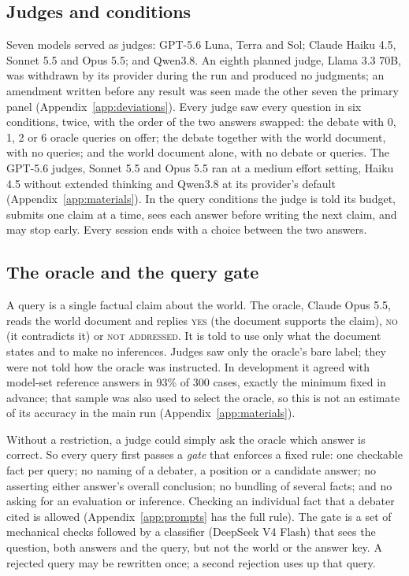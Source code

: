 \subsection{Judges and conditions}
\label{sec:conditions}

Seven models served as judges: GPT-5.6 Luna, Terra and Sol; Claude Haiku 4.5, Sonnet 5.5 and Opus 5.5; and Qwen3.8.
An eighth planned judge, Llama 3.3 70B, was withdrawn by its provider during the run and produced no judgments; an
amendment written before any result was seen made the other seven the primary panel
(Appendix~\ref{app:deviations}). Every judge saw every question in six conditions, twice, with the order of the two
answers swapped: the debate with 0, 1, 2 or 6 oracle queries on offer; the debate together with the world document,
with no queries; and the world document alone, with no debate or queries. The GPT-5.6
judges, Sonnet 5.5 and Opus 5.5 ran at a medium effort setting, Haiku 4.5 without extended thinking and Qwen3.8 at
its provider's default (Appendix~\ref{app:materials}). In the query conditions the judge is told its budget, submits one claim at a time, sees each answer before writing
the next claim, and may stop early. Every session ends with a choice between the two answers.

\subsection{The oracle and the query gate}
\label{sec:oracle}

A query is a single factual claim about the world. The oracle, Claude Opus 5.5, reads the world document and replies
\textsc{yes} (the document supports the claim), \textsc{no} (it contradicts it) or \textsc{not addressed}. It is
told to use only what the document states and to make no inferences. Judges saw only the oracle's bare label;
they were not told how the oracle was instructed. In development it agreed with model-set reference answers in 93\%
of 300 cases, exactly the minimum fixed in advance; that sample was also used to select the oracle, so this is not
an estimate of its accuracy in the main run (Appendix~\ref{app:materials}).

Without a restriction, a judge could simply ask the oracle which answer is correct. So every query first passes a
\emph{gate} that enforces a fixed rule: one checkable fact per query; no naming of a debater, a position or a
candidate answer; no asserting either answer's overall conclusion; no bundling of several facts; and no asking for
an evaluation or inference. Checking an individual fact that a debater cited is allowed
(Appendix~\ref{app:prompts} has the full rule). The gate is a set of mechanical checks followed by a
classifier (DeepSeek V4 Flash) that sees the question, both answers and the query, but not the world or the answer
key. A rejected query may be rewritten once; a second rejection uses up that query.

